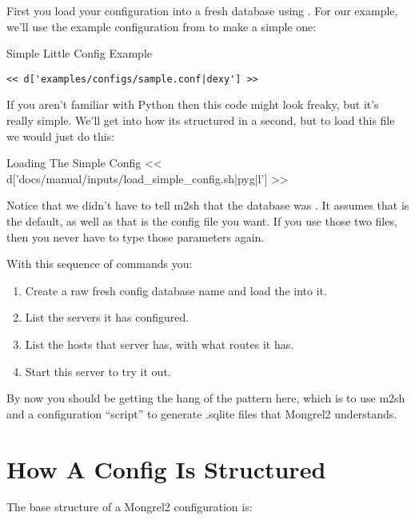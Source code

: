 First you load your configuration into a fresh database using .  For our example, we'll use the example configuration from
 to make a simple one:

\begin{code}{Simple Little Config Example}
\begin{lstlisting}
<< d['examples/configs/sample.conf|dexy'] >>
\end{lstlisting}
\end{code}

If you aren't familiar with Python then this code might look freaky, but it's really
simple.  We'll get into how its structured in a second, but to load this file
we would just do this:

\begin{code}{Loading The Simple Config}
<< d['docs/manual/inputs/load_simple_config.sh|pyg|l'] >>
\end{code}

Notice that we didn't have to tell m2sh that the database was .
It assumes that is the default, as well as that  is the config
file you want.  If you use those two files, then you never have to type those
parameters again.

With this sequence of commands you:

\begin{enumerate}
\item Create a raw fresh config database name  and load the  into it.
\item List the servers it has configured.
\item List the hosts that server has, with what routes it has.
\item Start this server to try it out.
\end{enumerate}

By now you should be getting the hang of the pattern here, which is to use
m2sh and a configuration ``script'' to generate .sqlite files
that Mongrel2 understands.

\section{How A Config Is Structured}

The base structure of a Mongrel2 configuration is:

